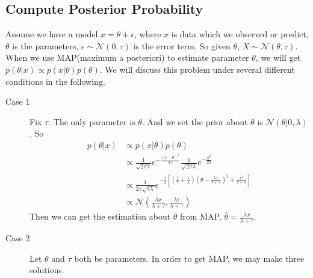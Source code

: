 \documentclass[11pt]{article}
\def\MN{{\mathcal N}}
\begin{document}
\subsection{Compute Posterior Probability}
Assume we have a model $x = \theta + \epsilon$, where $x$ is data which we observed or predict, $\theta$ is the parameters, $\epsilon \sim \MN(0, \tau)$ is the error term. So given $\theta$, $X \sim \MN(\theta, \tau)$. When we use MAP(maximum a posteriori) to estimate parameter $\theta$, we will get $p(\theta | x) \propto p(x | \theta)p(\theta)$. 
We will discuss this problem under several different conditions in the following.
\begin{description}
\item[Case 1] Fix $\tau$. The only parameter is $\theta$. And we set the prior about $\theta$ is $\MN(\theta | 0, \lambda)$. So
\[\begin{split} 
p(\theta | x) &\propto p(x | \theta) p(\theta) \\
&\propto \frac{1}{\sqrt{2\pi\tau}} e^{-\frac{(x - \theta)^2}{2\tau}} 
\frac{1}{\sqrt{2\pi\lambda}} e^{-\frac{\theta^2}{2\lambda}} \\
&\propto \frac{1}{2\pi \sqrt{\tau\lambda}} e^{-\frac{1}{2} [(\frac{1}{\tau} + \frac{1}{\lambda})( \theta - \frac{\lambda x}{\tau + \lambda} )^2 + \frac{x^2}{\tau + \lambda}] } \\
&\propto \MN(\frac{\lambda x}{\lambda+\tau},\frac{\lambda\tau}{\lambda+\tau})
\end{split}\]
Then we can get the estimation about $\theta$ from MAP, $\hat{\theta} = \frac{\lambda x}{\lambda + \tau}$.

\item[Case 2] Let $\theta$ and $\tau$ both be parameters. In order to get MAP, we may make three solutions.


\end{description}
\end{document}
